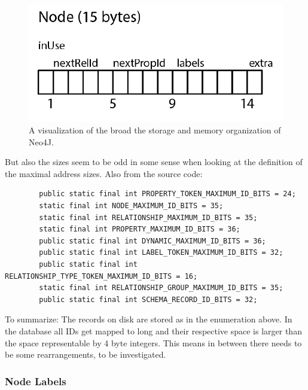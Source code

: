 \documentclass[a4paper,10pt]{article}
\begin{document}
    \begin{figure}[htp]\label{node_layout}
    \begin{center}
    \includegraphics[keepaspectratio,width=\textwidth]{img/node_layout.png}
    \end{center}
    \caption{A visualization of the broad the storage and memory organization of Neo4J.} %
    \end{figure}
    
     But also the sizes seem to be odd in some sense when looking at the definition of the maximal address sizes. Also from the source code:
     \begin{verbatim}
        public static final int PROPERTY_TOKEN_MAXIMUM_ID_BITS = 24;
        static final int NODE_MAXIMUM_ID_BITS = 35;
        static final int RELATIONSHIP_MAXIMUM_ID_BITS = 35;
        static final int PROPERTY_MAXIMUM_ID_BITS = 36;
        public static final int DYNAMIC_MAXIMUM_ID_BITS = 36;
        public static final int LABEL_TOKEN_MAXIMUM_ID_BITS = 32;
        public static final int RELATIONSHIP_TYPE_TOKEN_MAXIMUM_ID_BITS = 16;
        static final int RELATIONSHIP_GROUP_MAXIMUM_ID_BITS = 35;
        public static final int SCHEMA_RECORD_ID_BITS = 32;
     \end{verbatim}
    To summarize: The records on disk are stored as in the enumeration above. In the database all IDs get mapped to long and their respective space is larger than the space representable by 4 byte integers. This means in between there needs to be some rearrangements, to be investigated.
    
    \subsubsection{Node Labels}
    
\end{document}

